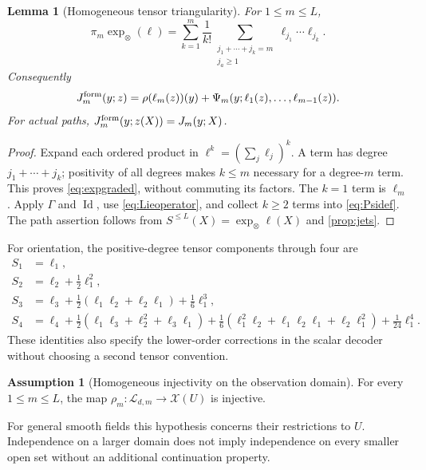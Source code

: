 \documentclass[11pt,a4paper]{article}
\numberwithin{equation}{section}
\newtheorem{lemma}[theorem]{Lemma}
\theoremstyle{definition}
\newtheorem{assumption}[theorem]{Assumption}
\theoremstyle{remark}
\DeclareMathOperator{\Id}{Id}
\newcommand{\Lie}{\mathcal L}
\begin{document}
\begin{lemma}[Homogeneous tensor triangularity]\label{lem:triangular}
For $1\leq m\leq L$,
\begin{equation}\label{eq:expgraded}
 \pi_m\exp_\otimes(\ell)
 =\sum_{k=1}^m\frac1{k!}
 \sum_{\substack{j_1+\cdots+j_k=m\\j_a\geq1}}
 \ell_{j_1}\cdots\ell_{j_k}.
\end{equation}
Consequently
\begin{equation}\label{eq:triangular}
 J_m^{\rm form}(y;z)
 =\rho(\ell_m(z))(y)+\Psi_m(y;\ell_1(z),\ldots,\ell_{m-1}(z)).
\end{equation}
For actual paths, $J_m^{\rm form}(y;z(X))=J_m(y;X)$.
\end{lemma}
\begin{proof}
Expand each ordered product in $\ell^k=(\sum_j\ell_j)^k$. A term has
degree $j_1+\cdots+j_k$; positivity of all degrees makes $k\leq m$
necessary for a degree-$m$ term. This proves \eqref{eq:expgraded}, without
commuting its factors. The $k=1$ term is $\ell_m$. Apply $\Gamma$ and
$\Id$, use \eqref{eq:Lieoperator}, and collect $k\geq2$ terms into
\eqref{eq:Psidef}. The path assertion follows from
$S^{\leq L}(X)=\exp_\otimes\ell(X)$ and \cref{prop:jets}.
\end{proof}

For orientation, the positive-degree tensor components through four are
\begin{align}\label{eq:exp4}
 S_1&=\ell_1,\nonumber\\
 S_2&=\ell_2+\tfrac12\ell_1^2,\nonumber\\
 S_3&=\ell_3+\tfrac12(\ell_1\ell_2+\ell_2\ell_1)
       +\tfrac16\ell_1^3,\nonumber\\
 S_4&=\ell_4+\tfrac12(\ell_1\ell_3+\ell_2^2+\ell_3\ell_1)
 +\tfrac16(\ell_1^2\ell_2+\ell_1\ell_2\ell_1+\ell_2\ell_1^2)
 +\tfrac1{24}\ell_1^4.
\end{align}
These identities also specify the lower-order corrections in the scalar
decoder without choosing a second tensor convention.

\begin{assumption}[Homogeneous injectivity on the observation domain]
\label{ass:injective}
For every $1\leq m\leq L$, the map
$\rho_m:\Lie_{d,m}\to\mathcal X(U)$ is injective.
\end{assumption}
For general smooth fields this hypothesis concerns their restrictions to
$U$. Independence on a larger domain does not imply independence on every
smaller open set without an additional continuation property.
\end{document}
